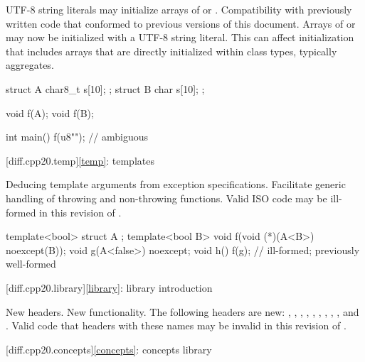 \change
UTF-8 string literals may initialize arrays of  or
.
\rationale
Compatibility with previously written code that conformed to previous versions of this document.
\effect
Arrays of  or 
may now be initialized with a UTF-8 string literal.
This can affect initialization that includes arrays
that are directly initialized within class types, typically aggregates.
\begin{example}
\begin{codeblock}
struct A {
  char8_t s[10];
};
struct B {
  char s[10];
};

void f(A);
void f(B);

int main() {
  f({u8""});            // ambiguous
}
\end{codeblock}
\end{example}

[diff.cpp20.temp]{\ref{temp}: templates}

\change
Deducing template arguments from exception specifications.
\rationale
Facilitate generic handling of throwing and non-throwing functions.
\effect
Valid ISO \CppXX{} code may be ill-formed in this revision of \Cpp{}.
\begin{example}
\begin{codeblock}
template<bool> struct A { };
template<bool B> void f(void (*)(A<B>) noexcept(B));
void g(A<false>) noexcept;
void h() {
  f(g);                         // ill-formed; previously well-formed
}
\end{codeblock}
\end{example}

[diff.cpp20.library]{\ref{library}: library introduction}

\change
New headers.
\rationale
New functionality.
\effect
The following \Cpp{} headers are new:
,
,
,
,
,
,
,
,
, and
.
Valid \CppXX{} code that  headers with these names may be
invalid in this revision of \Cpp{}.

[diff.cpp20.concepts]{\ref{concepts}: concepts library}

